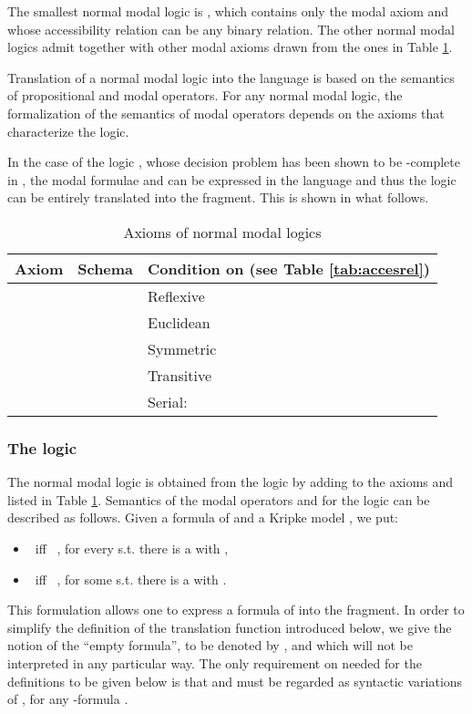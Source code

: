 \documentclass{fundam}
\begin{document}
The smallest normal modal logic is , which contains only the modal
axiom  and whose accessibility relation  can be any binary
relation.  The other normal modal logics admit together with 
other modal axioms drawn from the
ones in Table \ref{tab:modalax}.

Translation of a normal modal logic into the  language is
based on the semantics of propositional and modal operators. For any normal modal logic, the formalization of
the semantics of modal operators depends on the axioms that characterize the logic.

In the case of the logic , whose decision problem has been shown
to be -complete in \cite{Lad77}, the modal formulae
 and  can be expressed in the
 language and thus the logic  can be entirely translated
into the  fragment.  This is shown in what follows.


\begin{table}[tb]
\begin{center}
\begin{tabular}{|l|l|l|}
  \hline
Axiom & Schema & Condition on  (see Table \ref{tab:accesrel}) \\\hline
  &  & Reflexive \\
 &  & Euclidean \\
  &  & Symmetric \\
 &  & Transitive \\
  &  & Serial: \\
\hline
\end{tabular}
\caption{\label{tab:modalax} Axioms of normal modal logics}
\end{center}
\end{table}

\subsubsection{The logic }
The normal modal logic  is obtained from the logic  by
adding to  the axioms
 and  listed in Table \ref{tab:modalax}.  Semantics of the
modal operators  and  for the logic  can be
described as follows.  Given a formula  of  and a
Kripke model , we put:
\begin{itemize}
\item  ~iff~ , for every  s.t. there is a  with ,
\item  ~iff~ , for some  s.t. there is a  with .
\end{itemize}
This formulation allows one to express a formula  of 
into the  fragment.  In order to simplify the definition of
the translation function  introduced below, we give the notion
of the ``empty formula'', to be denoted by , and which will
not be interpreted in any particular way.  The only requirement on
 needed for the definitions to be given below is that
 and  must be regarded as
syntactic variations of , for any -formula .
\end{document}
